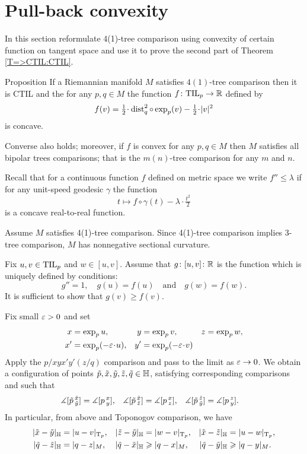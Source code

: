 \section{Pull-back convexity}\label{convexity}

In this section reformulate 4(1)-tree comparison using convexity of certain function on tangent space and use it to prove the second part of Theorem \ref{T=>CTIL:CTIL}.

\begin{thm}{Proposition}\label{prop:convexity}
If a Riemannian manifold $M$ satisfies $4(1)$-tree comparison then it is CTIL and the for any $p,q\in M$ the function $f\: \TIL_p\to \RR$ defined by
\[f(v)=\tfrac12\cdot\dist_q^2\circ\exp_p(v)-\tfrac12\cdot|v|^2\] 
is concave.

Converse also holds; moreover, if $f$ is convex for any $p,q\in M$ then $M$ satisfies all bipolar trees comparisons; that is the $m(n)$-tree comparison for any $m$ and $n$.
\end{thm}



Recall that for a continuous function $f$ defined on metric space we write 
$f''\le \lambda$ if for any unit-speed geodesic $\gamma$ the function
\[t\mapsto f\circ\gamma(t)-\lambda\cdot \tfrac{t^2}{2}\]
is a concave real-to-real function.

Assume $M$ satisfies 4(1)-tree comparison.
Since 4(1)-tree comparison implies 3-tree comparison,
$M$ has nonnegative sectional curvature.

Fix $u,v\in \TIL_p$ and $w\in [u,v]$.
Assume that $g\:[u,v]\:\RR$ is the function which is uniquely defined by conditions:
\[g''=1,\quad
g(u)=f(u)\quad
\text{and}\quad
g(w)=f(w).\]
It is sufficient to show that $g(v)\ge f(v)$.

Fix small $\eps>0$ and set
\begin{align*}
x&=\exp_p u, 
&y&=\exp_p v, 
&z&=\exp_pw,
\\
x'&=\exp_p(-\eps\cdot  u),
&y'&=\exp_p(-\eps\cdot  v)
\end{align*}
Apply the $p/xyx'y'(z/q)$ comparison and pass to the limit as $\eps\to 0$.
We obtain a configuration of points $\~p, \~x, \~y, \~z, \~q\in\HH$, satisfying corresponding comparisons and
such that
\begin{align*}
\measuredangle[\~p\,^{\~x}_{\~y}]&= \measuredangle[p\,^{x}_{y}],
&\measuredangle[\~p\,^{\~x}_{\~z}]&= \measuredangle[p\,^{x}_{z}],
&\measuredangle[\~p\,^{\~z}_{\~y}]&= \measuredangle[p\,^{z}_{y}].
\end{align*}
In particular,
from above and Toponogov comparison, we have
\begin{align*}
|\~x-\~y|_\HH&=|u-v|_{\T_p},
&|\~z-\~y|_\HH&=|w-v|_{\T_p},
&|\~x-\~z|_\HH&=|u-w|_{\T_p},
\\
|\~q-\~z|_\HH&=|q-z|_M,
&|\~q-\~x|_\HH&\ge|q-x|_M,
&|\~q-\~y|_\HH&\ge|q-y|_M.
\end{align*}

